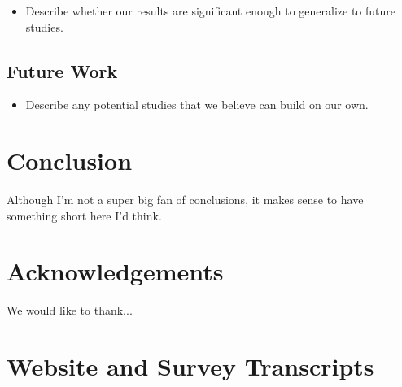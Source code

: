 \documentclass{sig-alternate-05-2015}
\begin{document}
\begin{itemize}
    \item Describe whether our results are significant enough to generalize to future studies.
\end{itemize}

\subsection{Future Work}

\begin{itemize}
    \item Describe any potential studies that we believe can build on our own.
\end{itemize}

\section{Conclusion}
Although I'm not a super big fan of conclusions, it makes sense to have something short here I'd think.

\section*{Acknowledgements}
We would like to thank...




\appendix
\section{Website and Survey Transcripts}
\end{document}
